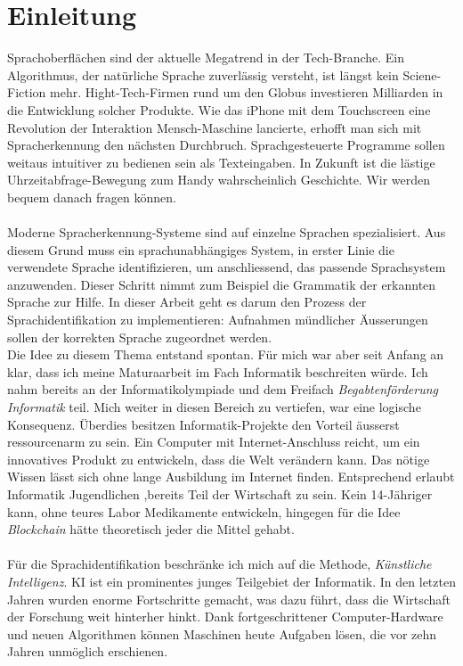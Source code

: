 \section{Einleitung}
Sprachoberflächen sind der aktuelle Megatrend in der Tech-Branche. Ein Algorithmus, der natürliche Sprache zuverlässig versteht, ist längst kein Sciene-Fiction mehr. Hight-Tech-Firmen rund um den Globus investieren Milliarden in die Entwicklung solcher Produkte. Wie das iPhone mit dem Touchscreen eine Revolution der Interaktion Mensch-Maschine lancierte, erhofft man sich mit Spracherkennung den nächsten Durchbruch. Sprachgesteuerte Programme sollen weitaus intuitiver zu bedienen sein als Texteingaben. In Zukunft ist die lästige Uhrzeitabfrage-Bewegung zum Handy wahrscheinlich Geschichte. Wir werden bequem danach fragen können.
\\ \\
Moderne Spracherkennung-Systeme sind auf einzelne Sprachen spezialisiert. Aus diesem Grund muss ein sprachunabhängiges System, in erster Linie die verwendete Sprache identifizieren, um anschliessend, das passende Sprachsystem anzuwenden. Dieser Schritt nimmt zum Beispiel die Grammatik der erkannten Sprache zur Hilfe. In dieser Arbeit geht es darum den Prozess der Sprachidentifikation zu implementieren:  Aufnahmen mündlicher Äusserungen sollen der korrekten Sprache zugeordnet werden. 
\\ 
Die Idee zu diesem Thema entstand spontan. Für mich war aber seit Anfang an klar, dass ich meine Maturaarbeit im Fach Informatik beschreiten würde. Ich nahm bereits an der Informatikolympiade und dem Freifach \textit{Begabtenförderung Informatik} teil. Mich weiter in diesen Bereich zu vertiefen, war eine logische Konsequenz. Überdies besitzen Informatik-Projekte den Vorteil äusserst ressourcenarm zu sein. Ein Computer mit Internet-Anschluss reicht, um ein innovatives Produkt zu entwickeln, dass die Welt verändern kann. Das nötige Wissen lässt sich ohne lange Ausbildung im Internet finden. Entsprechend erlaubt Informatik Jugendlichen ,bereits Teil der Wirtschaft zu sein. Kein 14-Jähriger kann, ohne teures Labor Medikamente entwickeln, hingegen für die Idee \textit{Blockchain} hätte theoretisch jeder die Mittel gehabt.
\\ \\
Für die Sprachidentifikation beschränke ich mich auf die Methode, \textit{Künstliche Intelligenz}. KI ist ein prominentes junges Teilgebiet der Informatik. In den letzten Jahren wurden enorme Fortschritte gemacht, was dazu führt, dass die Wirtschaft der Forschung weit hinterher hinkt. Dank fortgeschrittener Computer-Hardware und neuen Algorithmen können Maschinen heute Aufgaben lösen, die vor zehn Jahren unmöglich erschienen.
